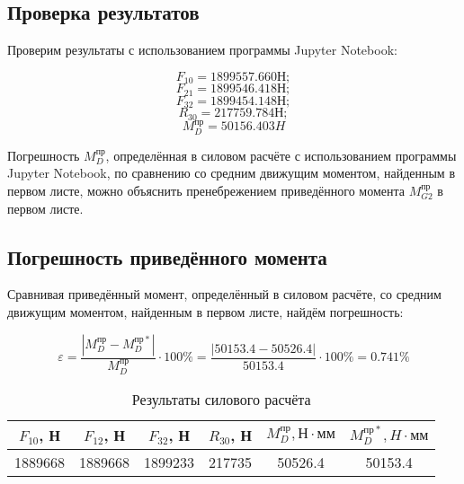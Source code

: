 \subsection{Проверка результатов}

Проверим результаты с использованием программы Jupyter Notebook:

	$$F_{10} = 1899557.660 Н;$$
	$$F_{21} = 1899546.418 Н;$$
	$$F_{32} = 1899454.148 Н;$$
	$$R_{30} = 217759.784 Н;$$
	$$M_D^{пр} = 50156.403 H$$

Погрешность $M_D^{пр}$, определённая в силовом расчёте с использованием программы Jupyter Notebook, по сравнению со средним движущим моментом, найденным в первом листе, можно объяснить пренебрежением приведённого момента $M_{G2}^{пр}$ в первом листе.

\subsection{Погрешность приведённого момента}

Сравнивая приведённый момент, определённый в силовом расчёте, со средним движущим моментом, найденным в первом листе, найдём погрешность:

 \begin{equation}
 	\varepsilon = \dfrac{ \left| M_D^{пр} - M_D^{пр*} \right| }{M_D^{пр}} \cdot 100 \% = \dfrac{\left|50153.4 - 50526.4\right|}{50153.4} \cdot 100 \%  = 0.741 \%
 \end{equation}
 
 \begin{table}
 	\caption{Результаты силового расчёта}
 \begin{tabular}{|c|c|c|c|c|c|}
 	\hline 
 	$F_{10}$, Н & $F_{12}$, Н & $F_{32}$, Н & $R_{30}$, Н &  $M_D^{пр},Н \cdot мм$ & $M_D^{пр*}, H \cdot мм$ \\ 
 	\hline 
 	1889668 & 1889668 & 1899233 & 217735 & 50526.4 & 50153.4 \\ 
 	\hline 
 \end{tabular} 
\end{table}